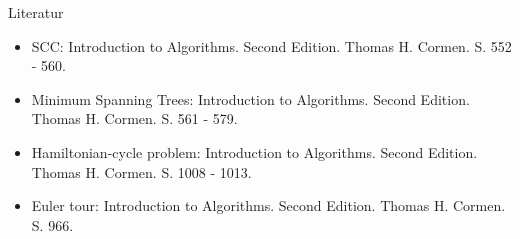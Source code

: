 \begin{frame}{Literatur}
  \begin{itemize}
  \item SCC: Introduction to Algorithms. Second Edition. Thomas H. Cormen. S. 552 - 560.
  \item Minimum Spanning Trees: Introduction to Algorithms. Second Edition. Thomas H. Cormen. S. 561 - 579.
  \item Hamiltonian-cycle problem: Introduction to Algorithms. Second Edition. Thomas H. Cormen. S. 1008 - 1013.
  \item Euler tour: Introduction to Algorithms. Second Edition. Thomas H. Cormen. S. 966.
  \end{itemize}
\end{frame}
